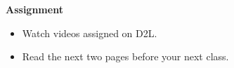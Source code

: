   
\noindent
{\bf Assignment} \vspace{-.2in}
\begin{itemize}
\item Watch videos assigned on D2L.
\item Read the next two pages before your next class.
\end{itemize}





